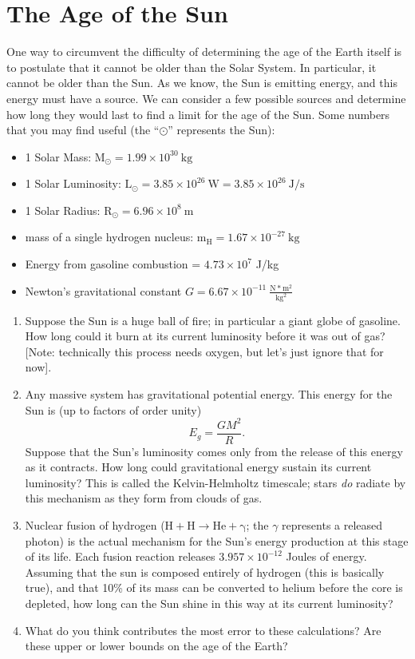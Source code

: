 \documentclass[12pt]{article}%
\begin{document}
\section*{The Age of the Sun}

One way to circumvent the difficulty of determining the age of the Earth itself is to postulate that it cannot be older than the Solar System. 
In particular, it cannot be older than the Sun.
As we know, the Sun is emitting energy, and this energy must have a source. 
We can consider a few possible sources and determine how long they would last to find a limit for the age of the Sun. 
Some numbers that you may find useful (the ``$\odot$'' represents the Sun):

\begin{itemize}
    \item 1 Solar Mass: $\mathrm{M_\odot = 1.99 \times 10^{30}~kg}$
    \item 1 Solar Luminosity: $\mathrm{L_\odot = 3.85 \times 10^{26}~W=3.85 \times 10^{26}~J/s}$
    \item 1 Solar Radius: $\mathrm{R_\odot = 6.96 \times 10^8~m}$
    \item mass of a single hydrogen nucleus: $\mathrm{m_H = 1.67 \times 10^{-27}~kg}$
    \item Energy from gasoline combustion = $4.73 \times 10^7$ J/kg
    \item Newton's gravitational constant $G = 6.67 \times 10^{-11}~\mathrm{\frac{N*m^2}{kg^2}}$
\end{itemize}

\begin{enumerate}
    \item Suppose the Sun is a huge ball of fire; in particular a giant globe of gasoline.  
    How long could it burn at its current luminosity before it was out of gas? 
    [Note: technically this process needs oxygen, but let's just ignore that for now]. 

    \item Any massive system has gravitational potential energy. 
    This energy for the Sun is (up to factors of order unity) 
    $$E_g = \frac{GM^2}{R}.$$
    Suppose that the Sun's luminosity comes only from the release of this energy as it contracts. 
    How long could gravitational energy sustain its current luminosity? 
    This is called the Kelvin-Helmholtz timescale; stars \textit{do} radiate by this mechanism as they form from clouds of gas.  

    \item Nuclear fusion of hydrogen ($\mathrm{H + H \rightarrow He + \gamma}$; the $\gamma$ represents a released photon) is the actual mechanism for the Sun's energy production at this stage of its life. 
    Each fusion reaction releases $3.957 \times 10^{-12}$ Joules of energy. 
    Assuming that the sun is composed entirely of hydrogen (this is basically true), and that 10\% of its mass can be converted to helium before the core is depleted, how long can the Sun shine in this way at its current luminosity? 
    \item What do you think contributes the most error to these calculations? Are these upper or lower bounds on the age of the Earth?
\end{enumerate}
\end{document}
